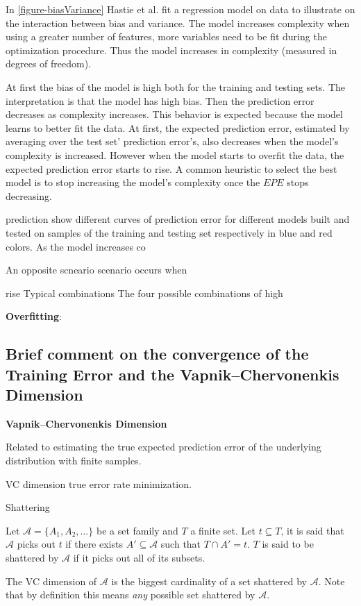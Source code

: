 In \ref{figure-biasVariance} Hastie et al. fit a regression model on data to illustrate on the interaction between bias and variance. The model increases complexity when using a greater number of features, more variables need to be fit during the optimization procedure. Thus the model increases in complexity (measured in degrees of freedom). 

At first the bias of the model is high both for the training and testing sets. The interpretation is that the model has high bias. Then the prediction error decreases as complexity increases. This behavior is expected because the model learns to better fit the data. At first, the expected prediction error, estimated by averaging over the test set' prediction error's, also decreases when the model's complexity is increased. However when the model starts to overfit the data, the expected prediction error starts to rise. A common heuristic to select the best model is to stop increasing the model's complexity once the $EPE$ stops decreasing.


prediction 
show different curves of prediction error for different models built and tested on samples of the training and testing set respectively in blue and red colors. As the model increases co

An opposite scneario scenario occurs when

rise Typical combinations
The four possible combinations of high 


\textbf{Overfitting}: 
 


\subsection{Brief comment on the convergence of the Training Error and the Vapnik–Chervonenkis Dimension}
\textbf{Vapnik–Chervonenkis Dimension}
\cite{vapnik-nature2013}
\cite{cherkassky-learning2007}

Related to estimating the true expected prediction error of the underlying distribution with finite samples.

VC dimension true error rate minimization. 


\begin{definition}{Shattering}

Let $\mathcal {A}= \{A_1,A_{2},\dots \}$ be a set family and $T$ a finite set. Let $t \subseteq T$, it is said that $\mathcal {A}$ picks out $t$ if there exists $A' \subseteq \mathcal {A} $ such that $ T \cap A' = t$. $T$ is said to be shattered by $\mathcal {A}$ if it picks out all of its subsets.

The VC dimension of $\mathcal {A}$ is the biggest cardinality of a set shattered by $\mathcal {A}$. Note that by definition this means \textit{any} possible set shattered by $\mathcal {A}$.
\end{definition}
 
